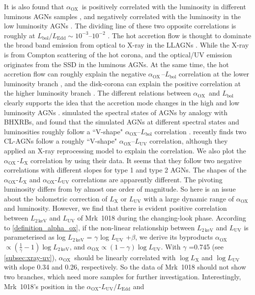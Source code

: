 \documentclass[twocolumn]{aastex63}
\newcommand{\alphaox}{$\alpha_\mathrm{OX}$}
\begin{document}
It is also found that  \alphaox\, is positively correlated with the luminosity in different luminous AGNs samples \citep[e.g.][]{2010A&A...512A..34L, 2013A&A...550A..71V,2016ApJ...819..154L}, and negatively correlated with the luminosity in the low luminosity AGNs \citep[e.g.][]{2011ApJ...739...64X,2017MNRAS.471.2848L}. The dividing line of these two opposite correlations is roughly at $L_\mathrm{bol}/L_\mathrm{Edd}\sim 10^{-3}$--$10^{-2}$ \citep{2011ApJ...739...64X,2017MNRAS.471.2848L}. The hot accretion flow is thought to dominate the broad band emission from optical to X-ray in the LLAGNs \citep[see reviews in ][]{2014ARA&A..52..529Y}. While the X-ray is from Compton scattering of the hot corona, and the optical/UV emission originates from the SSD in the luminous AGNs. At the same time, the hot accretion flow can roughly explain the negative \alphaox\,--$L_\mathrm{bol}$ correlation at the lower luminosity branch \citep{2011ApJ...739...64X,2017MNRAS.471.2848L}, and the disk-corona can explain the positive correlation at the higher luminosity branch \citep{2017A&A...602A..79L, 2018MNRAS.480.1247K,2019A&A...628A.135A}. The different relations between \alphaox\, and $L_\mathrm{bol}$ clearly supports the idea that the accretion mode changes in the high and low luminosity AGNs \citep[see][]{2011MNRAS.413.2259S,2019ApJ...883...76R}. \citet{2011MNRAS.413.2259S} simulated the spectral states of AGNs by analogy with BHXRBs, and found that the simulated AGNs at different spectral states and luminosities roughly follow a ``V-shape" \alphaox--$L_\mathrm{bol}$ correlation \citep[see also in ][]{2019ApJ...883...76R}. \citet{2019arXiv190904676R} recently finds two CL-AGNs follow a roughly ``V-shape" \alphaox--$L_\mathrm{UV}$ correlation, although they applied an X-ray reprocessing model to explain the correlation. We also plot the \alphaox\,-$L_\mathrm{X}$ correlation by using their data. It seems that they follow two negative correlations with different slopes for type 1 and type 2 AGNs. The shapes of the \alphaox-$L_\mathrm{X}$ and \alphaox-$L_\mathrm{UV}$ correlations are apparently different. The pivoting luminosity differs from \citet{2011ApJ...739...64X} by almost one order of magnitude. So here is an issue about the bolometric correction of $L_\mathrm{X}$ or $L_\mathrm{UV}$ with a large dynamic range of \alphaox \,and luminosity. However, we find that there is evident positive correlation between $L_\mathrm{2\,keV}$ and $L_\mathrm{UV}$ of Mrk~1018 during the changing-look phase. According to \autoref{definition_alpha_ox}, if the non-linear relationship between $L_\mathrm{2\,keV}$ and $L_\mathrm{UV}$ is parameterised as log $L_\mathrm{2\,keV}$ = $\gamma $ log $L_{\mathrm{UV}} $ +$\beta$, we derive its byproducts \alphaox $\propto (\frac{1}{\gamma}-1) \log L_\mathrm{2\,keV}$, and \alphaox $\propto (1-\gamma) \log L_\mathrm{UV}$. With $\gamma$ =0.745 (see \autoref{subsec:xray-uv}), \alphaox\, should be linearly correlated with $\log L_\mathrm{X}$ and $\log L_\mathrm{UV}$ with slope 0.34 and 0.26, respectively. So the data of Mrk~1018 should not show two branches, which need more samples for further investigation. Interestingly, Mrk~1018's position in the \alphaox-$L_\mathrm{UV}/L_\mathrm{Edd}$ and 
\end{document}
